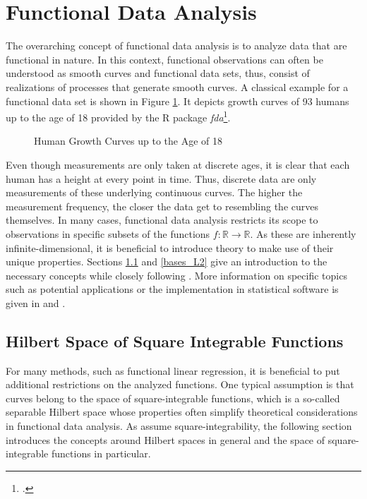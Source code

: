 \documentclass[12pt, a4paper]{article}
\theoremstyle{MAstyle} \newtheorem{assumption}{Assumption}[section]
\theoremstyle{MAstyle} \newtheorem{definition}{Definition}[section]
\theoremstyle{MAstyle} \newtheorem{theorem}{Theorem}[section]
\begin{document}
	\section{Functional Data Analysis}\label{FDA}
		The overarching concept of functional data analysis is to analyze data that are functional in nature. In this context, functional observations can often be understood as smooth curves and functional data sets, thus, consist of realizations of processes that generate smooth curves. A classical example for a functional data set is shown in Figure \ref{growth_curves}. It depicts growth curves of 93 humans up to the age of 18 provided by the R package \textit{fda}\footcite{fda}.
		\begin{figure}[H]
			\caption{Human Growth Curves up to the Age of 18}
			\label{growth_curves}
		\end{figure}
		Even though measurements are only taken at discrete ages, it is clear that each human has a height at every point in time. Thus, discrete data are only measurements of these underlying continuous curves. The higher the measurement frequency, the closer the data get to resembling the curves themselves.
		In many cases, functional data analysis restricts its scope to observations in specific subsets of the functions $f:\mathbb{R} \rightarrow \mathbb{R}$.
		As these are inherently infinite-dimensional, it is beneficial to introduce theory to make use of their unique properties. Sections \ref{Square_Integrable_Functions} and \ref{bases_L2} give an introduction to the necessary concepts while closely following \cite{hsing_theoretical_2015}. More information on specific topics such as potential applications or the implementation in statistical software is given in \cite{ramsay_functional_2005} and \cite{kokoszka_introduction_2021}.
	
		\subsection{Hilbert Space of Square Integrable Functions}\label{Square_Integrable_Functions}
			For many methods, such as functional linear regression, it is beneficial to put additional restrictions on the analyzed functions. One typical assumption is that curves belong to the space of square-integrable functions, which is a so-called separable Hilbert space whose properties often simplify theoretical considerations in functional data analysis. 
			As \cite{bugni_permutation_2021} assume square-integrability, the following section introduces the concepts around Hilbert spaces in general and the space of square-integrable functions in particular.\\
			
\end{document}
